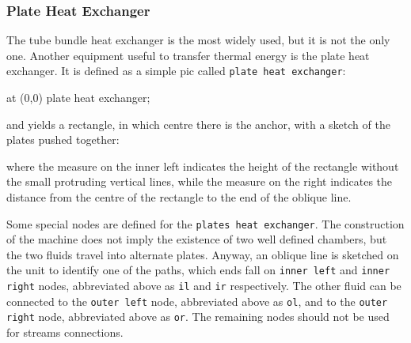 \documentclass[12pt]{article}						%
\newcommand*{\chpn}[1]{\texttt{#1}}				%
\newcommand*{\chpp}[1]{\texttt{#1}}				%
\begin{document}
\subsubsection{Plate Heat Exchanger}

The tube bundle heat exchanger is the most widely used, but it is not the only
one. Another equipment useful to transfer thermal energy is the plate heat
exchanger. It is defined as a simple pic called \chpp{plate heat exchanger}:
\begin{chpcode}
	\pic at (0,0) {plate heat exchanger};
\end{chpcode}
and yields a rectangle, in which centre there is the anchor, with a sketch of
the plates pushed together:
\begin{center}
\end{center}
where the measure on the inner left indicates the height of the rectangle without
the small protruding vertical lines, while the measure on the right indicates the
distance from the centre of the rectangle to the end of the oblique line.

Some special nodes are defined for the \chpp{plates heat exchanger}. The
construction of the machine does not imply the existence of two well defined
chambers, but the two fluids travel into alternate plates. Anyway, an oblique
line is sketched on the unit to identify one of the paths, which ends fall on
\chpn{inner left} and \chpn{inner right} nodes, abbreviated above as \chpn{il}
and \chpn{ir} respectively. The other fluid can be connected to the
\chpn{outer left} node, abbreviated above as \chpn{ol}, and to the 
\chpn{outer right} node, abbreviated above as \chpn{or}. The remaining nodes
should not be used for streams connections.
\end{document}
